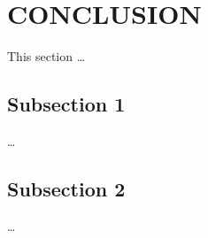 

\section{CONCLUSION}

    This section \ldots

    \subsection{Subsection 1}

        \ldots

    \subsection{Subsection 2}

        \ldots
